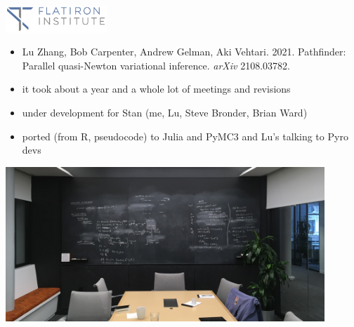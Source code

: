 \documentclass[9pt]{report}
\begin{document}
\sf%
\mbox{ }
\\[12pt]
\spc{{\LARGE\bfseries \color{MidnightBlue}{Pathfinder: }}}
\\[8pt]
\spc{\LARGE\bfseries \color{MidnightBlue}{Quasi-Newton variational inference}}
\\[36pt]
\noindent 
\spc{\large\bfseries \color{MidnightBlue}{Bob Carpenter}}
\\[2pt]
\\[2pt]
\vfill 
\noindent 
{}
\hfill 
\includegraphics[width=1.5in]{img/flatiron_logo.png}

\begin{itemize}
\item Lu Zhang, Bob Carpenter, Andrew Gelman, Aki
  Vehtari. 2021. Pathfinder: Parallel quasi-Newton variational
  inference. \textit{arXiv} 2108.03782.
  \item it took about a year and a whole lot of meetings and revisions
\item under development for Stan \hfill (me, Lu, Steve Bronder, Brian Ward)
\item ported (from R, pseudocode) to Julia and PyMC3 and Lu's talking to Pyro devs
\end{itemize}

\begin{center}
\includegraphics[width=0.9\textwidth]{img/stan-chalkboard.jpg}
\end{center}
\end{document}
